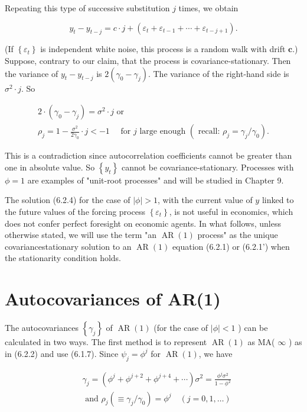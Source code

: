 \documentclass[10pt]{article}
\begin{document}
Repeating this type of successive substitution $j$ times, we obtain

$$
y_{t}-y_{t-j}=c \cdot j+\left(\varepsilon_{t}+\varepsilon_{t-1}+\cdots+\varepsilon_{t-j+1}\right) .
$$

(If $\left\{\varepsilon_{t}\right\}$ is independent white noise, this process is a random walk with drift $\boldsymbol{c}$.) Suppose, contrary to our claim, that the process is covariance-stationary. Then the variance of $y_{t}-y_{t-j}$ is $2\left(\gamma_{0}-\gamma_{j}\right)$. The variance of the right-hand side is $\sigma^{2} \cdot j$. So

$$
\begin{gathered}
2 \cdot\left(\gamma_{0}-\gamma_{j}\right)=\sigma^{2} \cdot j \text { or } \\
\rho_{j}=1-\frac{\sigma^{2}}{2 \gamma_{0}} \cdot j<-1 \quad \text { for } j \text { large enough }\left(\text { recall: } \rho_{j}=\gamma_{j} / \gamma_{0}\right) .
\end{gathered}
$$

This is a contradiction since autocorrelation coefficients cannot be greater than one in absolute value. So $\left\{y_{t}\right\}$ cannot be covariance-stationary. Processes with $\phi=1$ are examples of "unit-root processes" and will be studied in Chapter 9.

The solution (6.2.4) for the case of $|\phi|>1$, with the current value of $y$ linked to the future values of the forcing process $\left\{\varepsilon_{t}\right\}$, is not useful in economics, which does not confer perfect foresight on economic agents. In what follows, unless otherwise stated, we will use the term "an $\operatorname{AR}(1)$ process" as the unique covariancestationary solution to an $\operatorname{AR}(1)$ equation (6.2.1) or (6.2.1') when the stationarity condition holds.

\section*{Autocovariances of AR(1)}
The autocovariances $\left\{\gamma_{j}\right\}$ of $\operatorname{AR}(1)$ (for the case of $|\phi|<1$ ) can be calculated in two ways. The first method is to represent $\operatorname{AR}(1)$ as MA( $\infty$ ) as in (6.2.2) and use (6.1.7). Since $\psi_{j}=\phi^{j}$ for $\operatorname{AR}(1)$, we have


\begin{align*}
& \gamma_{j}=\left(\phi^{j}+\phi^{j+2}+\phi^{j+4}+\cdots\right) \sigma^{2}=\frac{\phi^{j} \sigma^{2}}{1-\phi^{2}}  \tag{6.2.5}\\
& \text { and } \rho_{j}\left(\equiv \gamma_{j} / \gamma_{0}\right)=\phi^{j} \quad(j=0,1, \ldots)
\end{align*}
\end{document}
